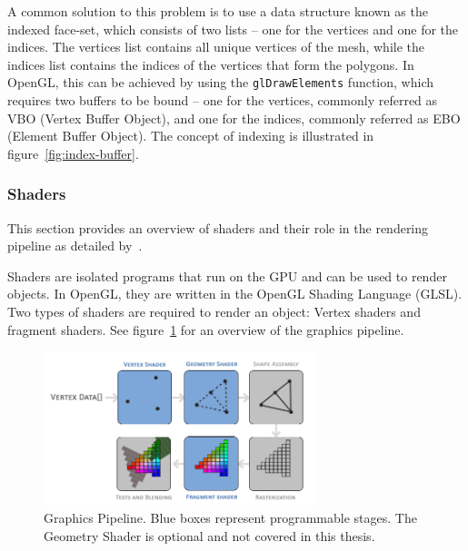 A common solution to this problem is to use a data structure known as the indexed face-set, which consists of two lists -- one for the vertices and one for the indices.
The vertices list contains all unique vertices of the mesh, while the indices list contains the indices of the vertices that form the polygons.
In OpenGL, this can be achieved by using the \texttt{glDrawElements} function, which requires two buffers to be bound
-- one for the vertices, commonly referred as VBO (Vertex Buffer Object), and one for the indices, commonly referred as EBO (Element Buffer Object).
The concept of indexing is illustrated in figure~\ref{fig:index-buffer}.~\cite{dorner_virtual_2019, de_vries_learn_2020}



\subsubsection{Shaders}\label{subsec:shaders}

This section provides an overview of shaders and their role in the rendering pipeline as detailed by~\cite{de_vries_learn_2020}.

Shaders are isolated programs that run on the GPU and can be used to render objects.
In OpenGL, they are written in the OpenGL Shading Language (GLSL).
Two types of shaders are required to render an object: Vertex shaders and fragment shaders.
See figure~\ref{fig:graphics-pipeline} for an overview of the graphics pipeline.
\begin{figure}[h!]
    \centering
    \includegraphics[width=0.70\textwidth]{images/graphics-pipeline}
    \caption{Graphics Pipeline. Blue boxes represent programmable stages. The Geometry Shader is optional and not covered in this thesis.}
    \label{fig:graphics-pipeline}
\end{figure}

